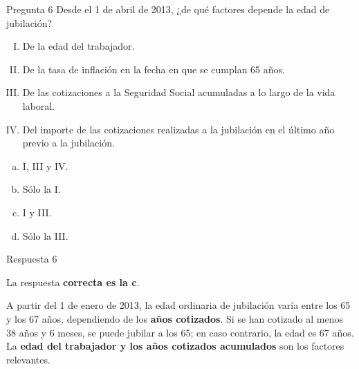 \documentclass[
  ignorenonframetext,
  aspectratio=54,
  spanish,
]{beamer}
\providecommand{\tightlist}{%
  \setlength{\itemsep}{0pt}\setlength{\parskip}{0pt}}
\begin{document}
\begin{frame}{Pregunta 6}
\label{pregunta-6}
Desde el 1 de abril de 2013, ¿de qué factores depende la edad de
jubilación?

\begin{enumerate}
[I.]
\tightlist
\item
  De la edad del trabajador.\\
\item
  De la tasa de inflación en la fecha en que se cumplan 65 años.\\
\item
  De las cotizaciones a la Seguridad Social acumuladas a lo largo de la
  vida laboral.\\
\item
  Del importe de las cotizaciones realizadas a la jubilación en el
  último año previo a la jubilación.
\end{enumerate}

\begin{enumerate}
[a.]
\tightlist
\item
  I, III y IV.
\item
  Sólo la I.
\item
  I y III.
\item
  Sólo la III.
\end{enumerate}
\end{frame}

\begin{frame}{Respuesta 6}
\label{respuesta-6}
\begin{tcolorbox}[enhanced jigsaw, rightrule=.15mm, colback=white, arc=.35mm, colframe=quarto-callout-tip-color-frame, leftrule=.75mm, bottomrule=.15mm, left=2mm, toprule=.15mm, opacityback=0, breakable]
\begin{minipage}[t]{5.5mm}
\textcolor{quarto-callout-tip-color}{\faLightbulb}
\end{minipage}%
\begin{minipage}[t]{\textwidth - 5.5mm}

La respuesta \textbf{correcta es la c}.

A partir del 1 de enero de 2013, la edad ordinaria de jubilación varía
entre los 65 y los 67 años, dependiendo de los \textbf{años cotizados}.
Si se han cotizado al menos 38 años y 6 meses, se puede jubilar a los
65; en caso contrario, la edad es 67 años. La \textbf{edad del
trabajador y los años cotizados acumulados} son los factores relevantes.

\end{minipage}%
\end{tcolorbox}
\end{frame}
\end{document}
